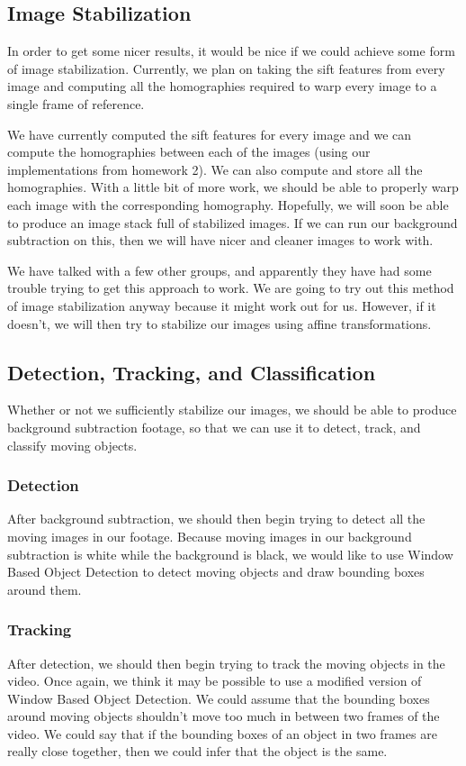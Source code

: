 \documentclass[a4paper, 10pt, conference]{ieeeconf}      %
\begin{document}
\subsection{Image Stabilization}
In order to get some nicer results, it would be nice if we could achieve some form of image stabilization. Currently, we plan on taking the sift features from every image and computing all the homographies required to warp every image to a single frame of reference. \newline

We have currently computed the sift features for every image and we can compute the homographies between each of the images (using our implementations from homework 2). We can also compute and store all the homographies. With a little bit of more work, we should be able to properly warp each image with the corresponding homography. Hopefully, we will soon be able to produce an image stack full of stabilized images. If we can run our background subtraction on this, then we will have nicer and cleaner images to work with. \newline

We have talked with a few other groups, and apparently they have had some trouble trying to get this approach to work. We are going to try out this method of image stabilization anyway because it might work out for us. However, if it doesn't, we will then try to stabilize our images using affine transformations.

\subsection{Detection, Tracking, and Classification}
Whether or not we sufficiently stabilize our images, we should be able to produce background subtraction footage, so that we can use it to detect, track, and classify moving objects. 

\subsubsection{Detection}
After background subtraction, we should then begin trying to detect all the moving images in our footage. Because moving images in our background subtraction is white while the background is black, we would like to use Window Based Object Detection to detect moving objects and draw bounding boxes around them.
 
\subsubsection{Tracking}
After detection, we should then begin trying to track the moving objects in the video. Once again, we think it may be possible to use a modified version of Window Based Object Detection. We could assume that the bounding boxes around moving objects shouldn't move too much in between two frames of the video. We could say that if the bounding boxes of an object in two frames are really close together, then we could infer that the object is the same. 
\end{document}
